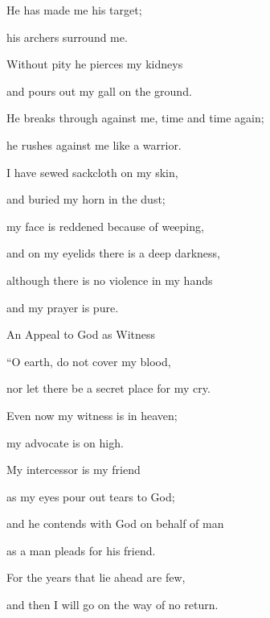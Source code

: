 {\par }{\Q He has made
me his target;
\par }{\Q {}his archers
surround
me.
\par }{\Q Without pity
he pierces
my kidneys
\par }{\Q and pours out
my gall
on the ground.
\par }{\Q {}He breaks through
against
me, time
and time
again;
\par }{\Q he rushes
against
me like a warrior.
\par }{\Q {}I have sewed
sackcloth
on
my skin,
\par }{\Q and buried my horn
in the dust;
\par }{\Q {}my face
is reddened
because of weeping,
\par }{\Q and on
my eyelids
there is a deep darkness,
\par }{\Q {}although there is no
violence
in my hands
\par }{\Q and my prayer
is pure.
\par }{\SH An Appeal to God as Witness
\par }{\Q {}“O earth,
do not
cover
my blood,
\par }{\Q nor let
there be
a secret place
for my cry.
\par }{\Q {}Even
now
my witness
is
in heaven;
\par }{\Q my advocate
is on high.
\par }{\Q {}My intercessor
is my friend
\par }{\Q as my eyes
pour out tears to God;
\par }{\Q {}and he contends
with
God
on behalf of man
\par }{\Q as a man
pleads for his friend.
\par }{\Q {}For
the years
that lie
ahead
are few,
\par }{\Q and then I will go on the way
of no
return.


\par }
